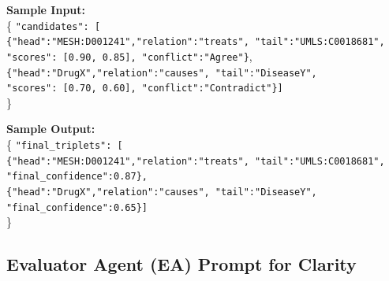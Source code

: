 \documentclass{article}
\begin{document}
\begin{tcolorbox}[colframe=black!25, colback=black!5, boxrule=0.5pt, arc=2pt]
\vspace{1mm}
\noindent
\textbf{Sample Input:}\\
\{
  \texttt{"candidates": [}\\
  \quad \texttt{\{"head":"MESH:D001241","relation":"treats",
  "tail":"UMLS:C0018681",}\\
  \quad \quad \texttt{"scores": [0.90, 0.85], "conflict":"Agree"\}},\\
  \quad \texttt{\{"head":"DrugX","relation":"causes",
  "tail":"DiseaseY",}\\
  \quad \quad \texttt{"scores": [0.70, 0.60], "conflict":"Contradict"\}]}\\
\}

\vspace{1mm}
\noindent
\textbf{Sample Output:}\\
\{
  \texttt{"final\_triplets": [}\\
  \quad \texttt{\{"head":"MESH:D001241","relation":"treats",
  "tail":"UMLS:C0018681",}\\
  \quad \quad \texttt{"final\_confidence":0.87\},}\\
  \quad \texttt{\{"head":"DrugX","relation":"causes",
  "tail":"DiseaseY",}\\
  \quad \quad \texttt{"final\_confidence":0.65\}]}\\
\}
\end{tcolorbox}
\newpage

\subsection{Evaluator Agent (EA) Prompt for Clarity}
\label{appendix:ea_prompt_clarity}
\end{document}
